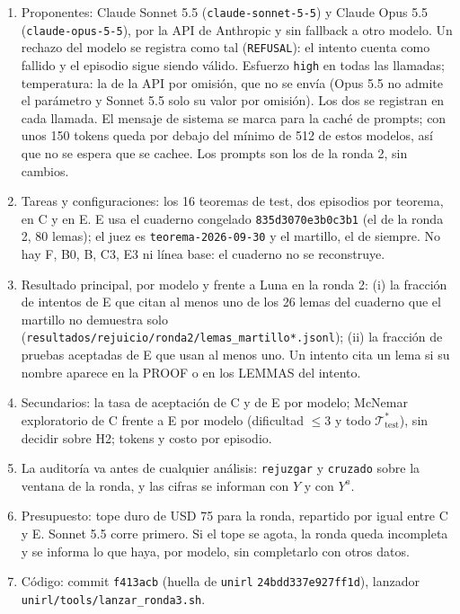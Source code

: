 \documentclass[11pt]{article}
\theoremstyle{remark}
\newcommand{\T}{\mathcal{T}}
\newcommand{\1}{\mathbb{1}}
\begin{document}
\begin{enumerate}
\item Proponentes: Claude Sonnet 5.5 (\texttt{claude-sonnet-5-5}) y Claude Opus 5.5 (\texttt{claude-opus-5-5}), por la API de Anthropic y sin fallback a otro modelo. Un rechazo del modelo se registra como tal (\texttt{REFUSAL}): el intento cuenta como fallido y el episodio sigue siendo válido. Esfuerzo \texttt{high} en todas las llamadas; temperatura: la de la API por omisión, que no se envía (Opus 5.5 no admite el parámetro y Sonnet 5.5 solo su valor por omisión). Los dos se registran en cada llamada. El mensaje de sistema se marca para la caché de prompts; con unos 150 tokens queda por debajo del mínimo de 512 de estos modelos, así que no se espera que se cachee. Los prompts son los de la ronda 2, sin cambios.
\item Tareas y configuraciones: los 16 teoremas de test, dos episodios por teorema, en C y en E. E usa el cuaderno congelado \texttt{835d3070e3b0c3b1} (el de la ronda 2, 80 lemas); el juez es \texttt{teorema-2026-09-30} y el martillo, el de siempre. No hay F, B0, B, C3, E3 ni línea base: el cuaderno no se reconstruye.
\item Resultado principal, por modelo y frente a Luna en la ronda 2: (i) la fracción de intentos de E que citan al menos uno de los 26 lemas del cuaderno que el martillo no demuestra solo (\texttt{resultados/rejuicio/ronda2/lemas\_martillo*.jsonl}); (ii) la fracción de pruebas aceptadas de E que usan al menos uno. Un intento cita un lema si su nombre aparece en la PROOF o en los LEMMAS del intento.
\item Secundarios: la tasa de aceptación de C y de E por modelo; McNemar exploratorio de C frente a E por modelo (dificultad $\le 3$ y todo $\T^*_{\mathrm{test}}$), sin decidir sobre H2; tokens y costo por episodio.
\item La auditoría va antes de cualquier análisis: \texttt{rejuzgar} y \texttt{cruzado} sobre la ventana de la ronda, y las cifras se informan con $Y$ y con $Y^a$.
\item Presupuesto: tope duro de USD 75 para la ronda, repartido por igual entre C y E. Sonnet 5.5 corre primero. Si el tope se agota, la ronda queda incompleta y se informa lo que haya, por modelo, sin completarlo con otros datos.
\item Código: commit \texttt{f413acb} (huella de \texttt{unirl} \texttt{24bdd337e927ff1d}), lanzador \texttt{unirl/tools/lanzar\_ronda3.sh}.
\end{enumerate}
\end{document}
